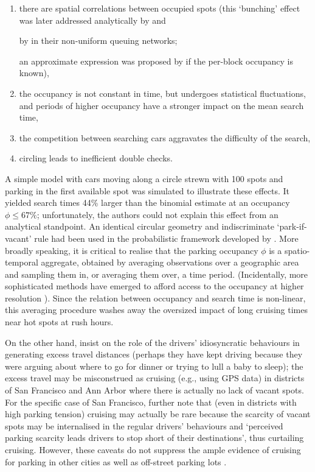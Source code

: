 \documentclass[trsc,reprint]{informs3}
\newcommand{\AN}[1]{#1}
\begin{document}
\begin{enumerate}
\item there are spatial correlations between occupied spots (this `bunching' effect was later addressed analytically by \citet{krapivsky2019simple,krapivsky2020should} and 
\AN{
by \citet{dowling2019modeling} in their non-uniform queuing networks;
}
an approximate expression was proposed by \citet{fulman2021approximation} if the per-block occupancy is known),
\item the occupancy is not constant in time, but undergoes statistical fluctuations, and periods of
higher occupancy have a stronger impact on the mean search time, 
\item the competition between searching cars aggravates the difficulty of the search,
\item circling leads to inefficient double checks.
\end{enumerate}
A simple model with cars moving along a circle strewn with 100 spots and parking in the first available spot was simulated to illustrate these effects. It yielded search times 44\% larger than
the binomial estimate at an occupancy ${\phi} \leqslant 67\%$; unfortunately, the authors could not explain this effect from an analytical standpoint.
\AN{An identical circular geometry and indiscriminate `park-if-vacant' rule had been used in the probabilistic framework developed by \citet{cao2015system}.}
More broadly speaking, it is critical to realise that 
the parking occupancy $\phi$ is a spatio-temporal aggregate, obtained by averaging observations over a geographic area and sampling them in, or averaging them over, a time period.
\AN{(Incidentally, more sophisticated methods have emerged to afford access to the occupancy at higher resolution \citep{yang2017turning})}. Since the relation between occupancy and search time is non-linear, this 
averaging procedure washes away the oversized impact of long cruising times
near hot spots at rush hours.

On the other hand, \citet{weinberger2020parking} insist on the role of the drivers' idiosyncratic behaviours in generating excess travel distances (perhaps they have kept driving because they were arguing about
where to go for dinner or trying to lull a baby to sleep); the excess travel
 may be misconstrued as cruising (e.g., using GPS data) in districts of San Francisco and Ann Arbor where there is actually no lack of vacant spots. For the specific case of San 
Francisco, \citet{millard2020parking} further note that (even in districts with high parking tension) cruising may actually be rare because the scarcity of vacant spots may be internalised in the regular drivers' behaviours and `perceived parking scarcity leads drivers to stop short of their destinations', thus curtailing cruising. However, these caveats do not suppress the ample evidence of cruising for parking in other cities  \citep{SARECO2005,shoup2006cruising,hampshire2018share,INRIX2017} as well as off-street parking lots \citep{paidi2022co2}. 
\end{document}
